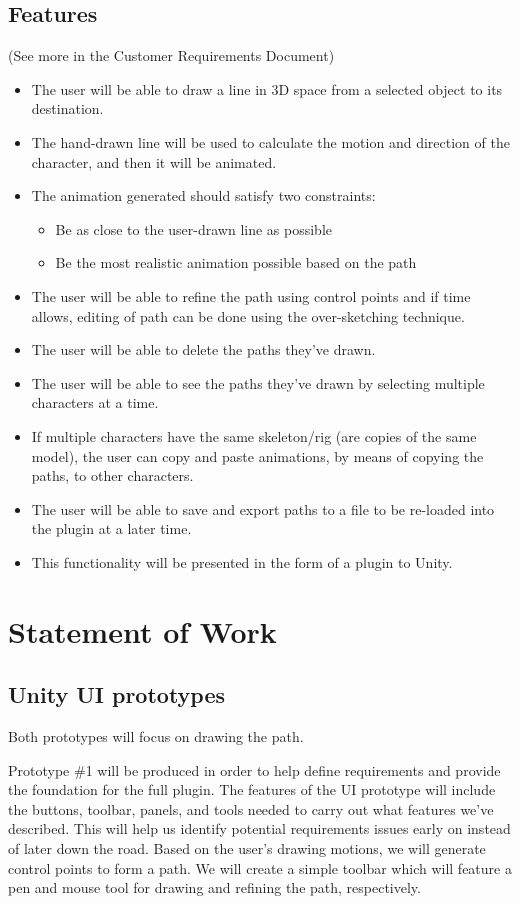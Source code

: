 \documentclass[12pt]{article}
\begin{document}
\subsection{Features}
(See more in the Customer Requirements Document)
\begin{itemize}
 \item The user will be able to draw a line in 3D space from a selected object to its destination.
 \item The hand-drawn line will be used to calculate the motion and direction of the character, and then it will be animated.
 \item The animation generated should satisfy two constraints:
	\begin{itemize}
	  \item Be as close to the user-drawn line as possible
	  \item Be the most realistic animation possible based on the path
	\end{itemize}
 \item The user will be able to refine the path using control points and if time allows, editing of path can be done using the over-sketching technique.
 \item The user will be able to delete the paths they've drawn.
 \item The user will be able to see the paths they've drawn by selecting multiple characters at a time.
 \item If multiple characters have the same skeleton/rig (are copies of the same model), the user can copy and paste animations, by means of copying the paths, to other characters.
\item The user will be able to save and export paths to a file to be re-loaded into the plugin at a later time.
 \item This functionality will be presented in the form of a plugin to Unity.
\end{itemize}


\section{Statement of Work}
\label{sec:work}
\subsection{Unity UI prototypes}
Both prototypes will focus on drawing the path.

Prototype \#1 will be produced in order to help define requirements and provide the foundation for the full plugin. The features of the UI prototype will include the buttons, toolbar, panels, and tools needed to carry out what features we've described. This will help us identify potential requirements issues early on instead of later down the road. Based on the user's drawing motions, we will generate control points to form a path. We will create a simple toolbar which will feature a pen and mouse tool for drawing and refining the path, respectively. 
\end{document}
